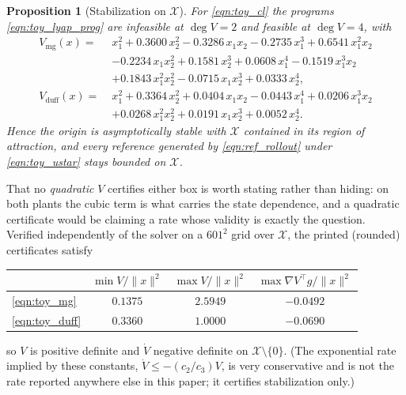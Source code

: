 \documentclass[lettersize,journal]{IEEEtran}
\newtheorem{proposition}{Proposition}
\begin{document}
\begin{proposition}[Stabilization on $\mathcal{X}$]\label{prop:toy_lyap}
For \eqref{eqn:toy_cl} the programs \eqref{eqn:toy_lyap_prog} are infeasible at
$\deg V = 2$ and feasible at $\deg V = 4$, with
\begin{align*}
V_{\mathrm{mg}}(x) =\;& x_1^2 + 0.3600\,x_2^2 - 0.3286\,x_1x_2
   - 0.2735\,x_1^3 + 0.6541\,x_1^2x_2 \\
 & - 0.2234\,x_1x_2^2 + 0.1581\,x_2^3 + 0.0608\,x_1^4 - 0.1519\,x_1^3x_2 \\
 & + 0.1843\,x_1^2x_2^2 - 0.0715\,x_1x_2^3 + 0.0333\,x_2^4, \\
V_{\mathrm{duff}}(x) =\;& x_1^2 + 0.3364\,x_2^2 + 0.0404\,x_1x_2
   - 0.0443\,x_1^4 + 0.0206\,x_1^3x_2 \\
 & + 0.0268\,x_1^2x_2^2 + 0.0191\,x_1x_2^3 + 0.0052\,x_2^4 .
\end{align*}
Hence the origin is asymptotically stable with $\mathcal{X}$ contained in its
region of attraction, and every reference generated by \eqref{eqn:ref_rollout}
under \eqref{eqn:toy_ustar} stays bounded on $\mathcal{X}$.
\end{proposition}

That no \emph{quadratic} $V$ certifies either box is worth stating rather than
hiding: on both plants the cubic term is what carries the state dependence, and
a quadratic certificate would be claiming a rate whose validity is exactly the
question. Verified independently of the solver on a $601^2$ grid over
$\mathcal{X}$, the printed (rounded) certificates satisfy
\begin{center}
\begin{tabular}{lccc}
\toprule
 & $\min V/\|x\|^2$ & $\max V/\|x\|^2$ & $\max \nabla V^\top g/\|x\|^2$ \\
\midrule
\eqref{eqn:toy_mg}   & $0.1375$ & $2.5949$ & $-0.0492$ \\
\eqref{eqn:toy_duff} & $0.3360$ & $1.0000$ & $-0.0690$ \\
\bottomrule
\end{tabular}
\end{center}
so $V$ is positive definite and $\dot V$ negative definite on
$\mathcal{X}\setminus\{0\}$. (The exponential rate implied by these constants,
$\dot V \le -(c_2/c_3)V$, is very conservative and is not the rate reported
anywhere else in this paper; it certifies stabilization only.)
\end{document}
